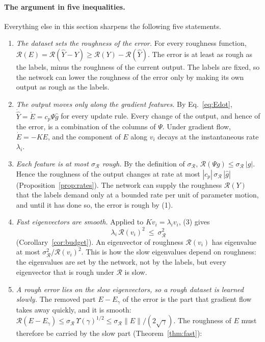 \documentclass[11pt]{article}
\theoremstyle{definition}
\theoremstyle{remark}
\newcommand{\Rgh}{\mathcal{R}}           %
\newcommand{\sR}{\sigma_{\Rgh}}
\begin{document}
\paragraph{The argument in five inequalities.}
Everything else in this section sharpens the following five statements.
\begin{enumerate}[label=(\arabic*)]
\item \emph{The dataset sets the roughness of the error.}
For every roughness function, $\Rgh(E) = \Rgh(\hat Y - Y) \ge \Rgh(Y) - \Rgh(\hat Y)$.
The error is at least as rough as the labels, minus the roughness of the current output.
The labels are fixed, so the network can lower the roughness of the error only by making its own output as rough as the labels.
\item \emph{The output moves only along the gradient features.}
By Eq.~\eqref{eq:Edot}, $\dot{\hat Y} = \dot E = c_p\Psi\hat g$ for every update rule.
Every change of the output, and hence of the error, is a combination of the columns of $\Psi$.
Under gradient flow, $\dot E = -KE$, and the component of $E$ along $v_i$ decays at the instantaneous rate $\lambda_i$.
\item \emph{Each feature is at most $\sR$ rough.}
By the definition of $\sR$, $\Rgh(\Psi g) \le \sR\,|g|$.
Hence the roughness of the output changes at rate at most $|c_p|\,\sR\,|\hat g|$ (Proposition~\ref{prop:rates}).
The network can supply the roughness $\Rgh(Y)$ that the labels demand only at a bounded rate per unit of parameter motion, and until it has done so, the error is rough by (1).
\item \emph{Fast eigenvectors are smooth.}
Applied to $Kv_i = \lambda_i v_i$, (3) gives
\begin{equation}\label{eq:budget-intro}
\lambda_i\,\Rgh(v_i)^2 \ \le\ \sR^2
\end{equation}
(Corollary~\ref{cor:budget}).
An eigenvector of roughness $\Rgh(v_i)$ has eigenvalue at most $\sR^2/\Rgh(v_i)^2$.
This is how the slow eigenvalues depend on roughness: the eigenvalues are set by the network, not by the labels, but every eigenvector that is rough under $\Rgh$ is slow.
\item \emph{A rough error lies on the slow eigenvectors, so a rough dataset is learned slowly.}
The removed part $E - E_\gamma$ of the error is the part that gradient flow takes away quickly, and it is smooth: $\Rgh(E - E_\gamma) \le \sR\,\Upsilon(\gamma)^{1/2} \le \sR\|E\|/(2\sqrt\gamma)$.
The roughness of $E$ must therefore be carried by the slow part (Theorem~\ref{thm:fast}):

\end{enumerate}
\end{document}
